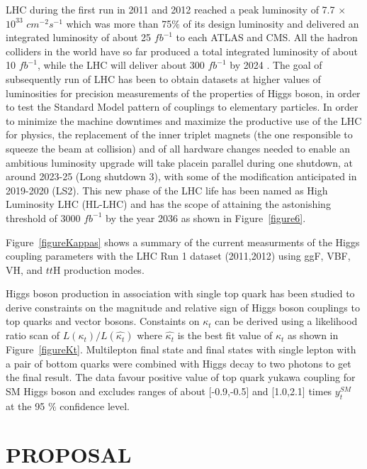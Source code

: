 \documentclass[final,3p]{CSP}
\begin{document}
LHC during the first run in 2011 and 2012 reached a peak luminosity of 7.7 $\times$ $10^{33}$ $cm^{-2}s^{-1}$ which was more than 75$\%$ of its design luminosity and delivered an integrated luminosity of about 25 $fb^{-1}$ to each ATLAS and CMS.
All the hadron colliders in the world have so far produced a total integrated luminosity of about 10 $fb^{-1}$, while the LHC will deliver about 300 $fb^{-1}$ by 2024 \cite{collaborations2019report}.
The goal of subsequently run of LHC has been to obtain datasets at higher values of luminosities for precision measurements of the properties of Higgs boson, in order to test the Standard Model pattern of couplings to elementary particles.
In order to minimize the machine downtimes and maximize the productive use of the LHC for physics, the replacement of the inner triplet magnets (the one responsible to squeeze the beam at collision) and  of  all  hardware  changes  needed  to  enable  an  ambitious  luminosity  upgrade  will  take  placein parallel during one shutdown, at around 2023-25 (Long shutdown 3), with some of the modification anticipated in 2019-2020 (LS2).
This new phase of the LHC life has been named as High Luminosity LHC (HL-LHC) and has the scope of attaining the astonishing threshold of 3000 $fb^{-1}$ by the year 2036 as shown in Figure~\ref{figure6}. 


Figure~\ref{figureKappas} shows a summary of the current measurments of the Higgs coupling parameters with the LHC Run 1 dataset (2011,2012)  using ggF, VBF, VH, and $tt$H production modes.

Higgs boson production in association with single top quark has been studied to derive constraints on the magnitude and relative sign of Higgs boson couplings to top quarks and vector bosons.
Constaints on $\kappa_t$ can be derived using a likelihood ratio scan of $L(\kappa_t)/L(\hat{\kappa_t})$ where $\hat{\kappa_t}$ is the best fit value of $\kappa_t$ as shown in Figure~\ref{figureKt}.
Multilepton final state and final states with single lepton with a pair of bottom quarks were combined with Higgs decay to two photons to get the final result. The data favour positive value of top quark yukawa coupling for SM Higgs boson and excludes ranges of about [-0.9,-0.5] and [1.0,2.1] times $y^{SM}_t$ at the 95 $\%$ confidence level. 


\newpage
\section{PROPOSAL}
\end{document}

